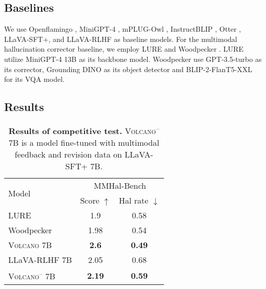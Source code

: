 \documentclass[11pt]{article}
\newcommand{\Ours}{\textsc{Volcano}}
\begin{document}
\subsection{Baselines}
\label{subsec:baselines}
We use Openflamingo \citep{awadalla2023openflamingo}, MiniGPT-4 \citep{zhu2023minigpt4}, mPLUG-Owl \citep{ye2023mplugowl}, InstructBLIP \citep{dai2023instructblip}, Otter \citep{li2023otter}, LLaVA-SFT+, and LLaVA-RLHF \citep{sun2023aligning} as baseline models. For the multimodal hallucination corrector baseline, we employ LURE \citep{zhou2023analyzing} and Woodpecker \citep{yin2023woodpecker}. LURE utilize MiniGPT-4 13B as its backbone model. Woodpecker use GPT-3.5-turbo as its corrector, Grounding DINO \citep{liu2023grounding} as its object detector and BLIP-2-FlanT5-XXL \citep{li2023blip2} for its VQA model.
\subsection{Results}
\label{subsec:results}
\begin{table}[t]
\centering
\small
\begin{tabular}{lcc}
\toprule
\multirow{2}{*}{Model} & \multicolumn{2}{c}{MMHal-Bench} \\
& Score $\uparrow$ & Hal rate $\downarrow$  \\
\midrule
LURE & 1.9 & 0.58  \\
Woodpecker & 1.98 & 0.54  \\
{\Ours} 7B  & \textbf{2.6} & \textbf{0.49} \\
\midrule
LLaVA-RLHF 7B & 2.05 & 0.68  \\
{\Ours}\textsuperscript{--} 7B  & \textbf{2.19} & \textbf{0.59}  \\
\bottomrule
\end{tabular}
\caption{\textbf{Results of competitive test.} {\Ours}\textsuperscript{--} 7B is a model fine-tuned with multimodal feedback and revision data on LLaVA-SFT+ 7B.}
\label{tab:Table2}
\end{table}
\end{document}
